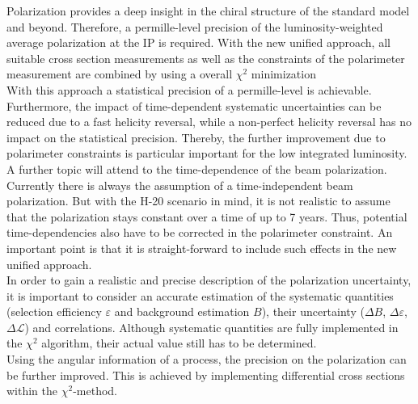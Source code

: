 \documentclass[a4paper]{article}
\begin{document}
Polarization provides a deep insight in the chiral structure of the standard model and beyond. Therefore, a permille-level precision of the luminosity-weighted average polarization at the IP is required. With the new unified approach, all suitable cross section measurements as well as the constraints of the polarimeter measurement are combined by using a overall $\chi^{2}$ minimization\\
With this approach a statistical precision of a permille-level is achievable. Furthermore, the impact of time-dependent systematic uncertainties can be reduced due to a fast helicity reversal, while a non-perfect helicity reversal has no impact on the statistical precision. Thereby, the further improvement due to polarimeter constraints is particular important for the low integrated luminosity.\\
A further topic will attend to the time-dependence of the beam polarization. Currently there is always the assumption of a time-independent beam polarization. But with the H-20\cite{ILCrunningscenario} scenario in mind, it is not realistic to assume that the polarization stays constant over a time of up to 7 years. Thus,  potential time-dependencies also have to be corrected in the polarimeter constraint. An important point is that it is straight-forward to include such effects in the new unified approach.\\
In order to gain a realistic and precise description of the polarization uncertainty, it is important to consider an accurate estimation of the systematic quantities (selection efficiency $\varepsilon$ and background estimation $B$), their uncertainty ($\Delta B$, $\Delta\varepsilon$, $\Delta\mathcal{L}$) and correlations. Although systematic quantities are fully implemented in the $\chi^{2}$ algorithm, their actual value still has to be determined.\\
Using the angular information of a process, the precision on the polarization can be further improved. This is achieved by implementing differential cross sections within the $\chi^2$-method.\\
\end{document}
